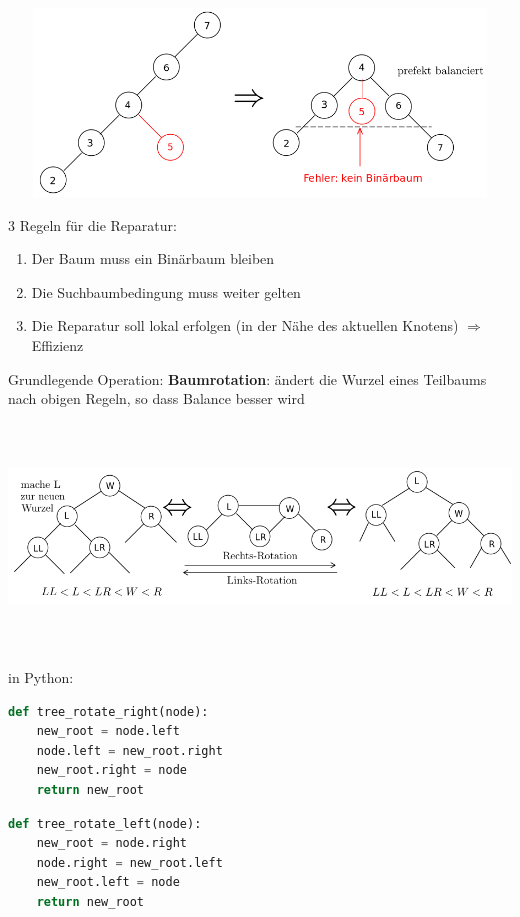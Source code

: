\documentclass[11pt, fleqn]{scrreprt}
\begin{document}
\includegraphics[width=15cm,height=5cm,keepaspectratio]{./Pictures/Reparatur.png}

3 Regeln für die Reparatur:
\begin{enumerate}
	\item Der Baum muss ein Binärbaum bleiben
	\item Die Suchbaumbedingung muss weiter gelten
	\item Die Reparatur soll lokal erfolgen (in der Nähe des aktuellen Knotens) $\Rightarrow$ Effizienz
\end{enumerate}

Grundlegende Operation: \textbf{Baumrotation}: ändert die Wurzel eines Teilbaums nach obigen Regeln, so dass Balance besser wird
	
\includegraphics[width=16cm,height=6cm,keepaspectratio]{./Pictures/Rotation.png}

in Python:
\begin{lstlisting}[language=Python]
def tree_rotate_right(node):
	new_root = node.left
	node.left = new_root.right
	new_root.right = node
	return new_root
\end{lstlisting}

\begin{lstlisting}[language=Python]
def tree_rotate_left(node):
	new_root = node.right
	node.right = new_root.left
	new_root.left = node
	return new_root
\end{lstlisting}
			
\end{document}
